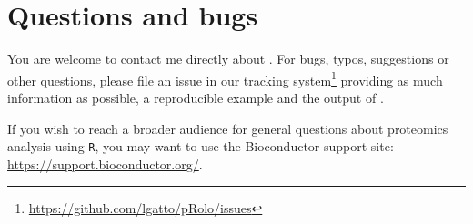 \section*{Questions and bugs}

You are welcome to contact me directly about . For
bugs, typos, suggestions or other questions, please file an issue in
our tracking
system\footnote{\url{https://github.com/lgatto/pRolo/issues}}
providing as much information as possible, a reproducible example and
the output of .

If you wish to reach a broader audience for general questions about
proteomics analysis using \texttt{R}, you may want to use the
Bioconductor support site: \url{https://support.bioconductor.org/}.

